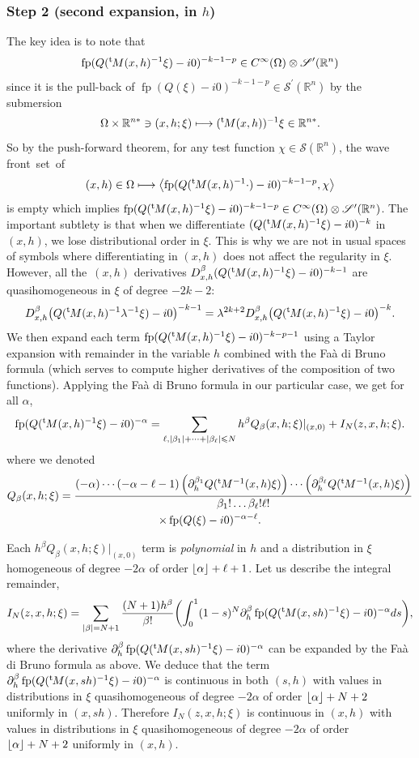 \documentclass[10pt]{amsart}
\let\pazocal\mathscr
\def\mto{\mathchoice{\longmapsto}{\mapsto}{\mapsto}{\mapsto}}
\theoremstyle{definition}
\let\cv\alpha
\let\Re\relax
\DeclareMathOperator{\Re}{Re}
\DeclareMathOperator*{\pf}{fp}
\newcommand{\plancher}[1]{\left \lfloor #1 \right \rfloor }
\newcommand{\step}[1]{\subsubsection*{Step #1}}
\renewcommand{\t}{{{}^{\mathrm{t}\mkern-2mu}}}
\begin{document}
\step{2 (second expansion, in $h$)}
The key idea is to note that
\[
\pf(Q(\t M(x, h)^{-1}\xi)-i0)^{-k-1-p}\in C^\infty(\Omega)\otimes \pazocal{S}^\prime(\mathbb{R}^n)
\]
since it is the pull-back of $\pf(Q(\xi)-i0)^{-k-1-p}\in \pazocal{S}^\prime(\mathbb{R}^n)$ by the submersion
\[
\Omega\times \mathbb{R}^{n*} \ni (x,h;\xi) \mto (\t M(x,h))^{-1}\xi\in \mathbb{R}^{n*}.
\]
So by the push-forward theorem, for any test function $\chi\!\in\! \pazocal{S}(\mathbb{R}^n)$, the wave front~set~of
\[
(x,h)\in \Omega\mto \left\langle \pf(Q(\t M(x, h)^{-1}\cdot)-i0)^{-k-1-p},\chi\right\rangle
\]
is empty which implies $\pf(Q(\t M(x, h)^{-1}\xi)-i0)^{-k-1-p}\in C^\infty(\Omega)\otimes \pazocal{S}^\prime(\mathbb{R}^n)$.
The important subtlety is that when we differentiate $(Q(\t M(x,h)^{-1}\xi)-i0)^{-k} $ in $(x,h)$, we lose
distributional order in $\xi$. This is why we are not in usual spaces of symbols where differentiating in $(x,h)$ does not affect the regularity in $\xi$. However, all the~$(x,h)$ derivatives $D_{x,h}^\beta(Q(\t M(x,h)^{-1}\xi)-i0)^{-k-1} $ are quasihomogeneous in $\xi$ of degree \hbox{$-2k-2$}:
\[
D_{x,h}^\beta\big(Q(\t M(x,h)^{-1}\lambda^{-1}\xi)-i0\big)^{-k-1}=\lambda^{2k+2}D_{x,h}^\beta\big(Q(\t M(x,h)^{-1}\xi)-i0\big)^{-k}.
\]
We then expand each term
$\pf(Q(\t M(x, h)^{-1}\xi)-i0)^{-k-p-1}$ using a Taylor expansion with remainder in the variable $h$ combined with the Faà di Bruno formula (which serves to compute higher derivatives of the composition of two functions). {Applying the Faà di Bruno formula in our particular case, we get} for all $\cv$,
\[
\pf(Q(\t M(x, h)^{-1}\xi)-i0)^{-\cv} =\sum_{\ell, \vert \beta_1\vert+\dots+\vert\beta_\ell\vert\leqslant N} h^\beta Q_\beta(x,h;\xi)
|_{(x,0)}+I_N(z,x,h;\xi).
\]
where we denoted
\begin{multline*}
Q_\beta(x,h;\xi) = \frac{(-\cv)\cdots(-\cv-\ell-1) \left(\partial_h^{\beta_1}Q(\t M^{-1}(x,h)\xi)\right)\cdots
\left(\partial_h^{\beta_\ell}Q(\t M^{-1}(x,h)\xi)\right) }{\beta_1!\dots\beta_\ell!\ell!}
\\ \times \pf(Q(\xi)-i0)^{-\cv-\ell}.
\end{multline*}

Each $h^\beta Q_\beta(x,h;\xi) |_{(x,0)}$
term is \emph{polynomial} in $h$ and a distribution in $\xi$ homogeneous of degree $-2\cv$ of order $\plancher{\Re\cv}+\ell+1$.
Let us describe the integral remainder,
\[
I_N(z,x,h;\xi)= \sum_{\vert\beta\vert=N+1} \frac{(N+1)h^\beta}{\beta !} \biggl(\int_0^1 (1-s)^{N}\partial^\beta_h\pf(Q(\t M(x,sh)^{-1}\xi)-i0)^{-\cv}ds\biggr),
\]
where the derivative
$\partial^\beta_h\pf(Q(\t M(x,sh)^{-1}\xi)-i0)^{-\cv}$ can be expanded by the Faà di Bruno formula as above.
We deduce that the term $\partial^\beta_h\pf(Q(\t M(x,sh)^{-1}\xi)-i0)^{-\cv}$
is continuous in both $(s,h)$ with values in distributions in $\xi$ quasihomogeneous of degree $-2\cv$
of order $\plancher{\Re\cv}+N+2$ uniformly in $(x,sh)$. Therefore
$I_N(z,x,h;\xi)$ is continuous in $(x,h)$ with values in distributions in $\xi$ quasihomogeneous of degree $-2\cv$
of order $\plancher{\Re\cv}+N+2$ uniformly in $(x,h)$.
\end{document}
